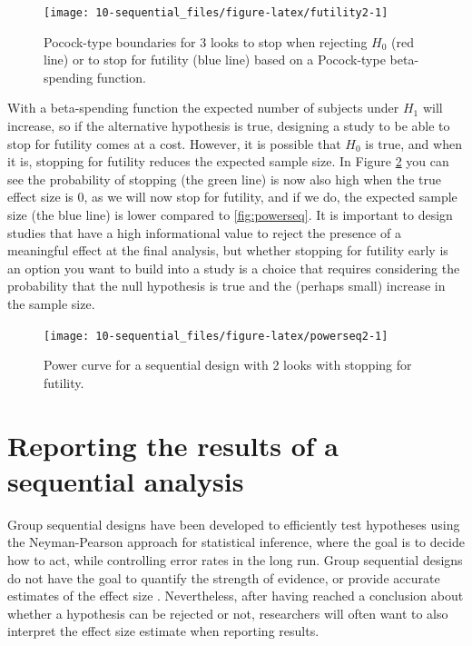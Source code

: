 \documentclass[
  oneside]{book}
\begin{document}
\begin{figure}

{\centering \texttt{[image: 10-sequential\_files/figure-latex/futility2-1]} 

}

\caption{Pocock-type boundaries for 3 looks to stop when rejecting $H_0$ (red line) or to stop for futility (blue line) based on a Pocock-type beta-spending function.}\label{fig:futility2}
\end{figure}

With a beta-spending function the expected number of subjects under \(H_1\) will increase, so if the alternative hypothesis is true, designing a study to be able to stop for futility comes at a cost. However, it is possible that \(H_0\) is true, and when it is, stopping for futility reduces the expected sample size. In Figure \ref{fig:powerseq2} you can see the probability of stopping (the green line) is now also high when the true effect size is 0, as we will now stop for futility, and if we do, the expected sample size (the blue line) is lower compared to \ref{fig:powerseq}. It is important to design studies that have a high informational value to reject the presence of a meaningful effect at the final analysis, but whether stopping for futility early is an option you want to build into a study is a choice that requires considering the probability that the null hypothesis is true and the (perhaps small) increase in the sample size.

\begin{figure}

{\centering \texttt{[image: 10-sequential\_files/figure-latex/powerseq2-1]} 

}

\caption{Power curve for a sequential design with 2 looks with stopping for futility.}\label{fig:powerseq2}
\end{figure}

\hypertarget{reporting-the-results-of-a-sequential-analysis}{%
\section{Reporting the results of a sequential analysis}\label{reporting-the-results-of-a-sequential-analysis}}

Group sequential designs have been developed to efficiently test hypotheses using the Neyman-Pearson approach for statistical inference, where the goal is to decide how to act, while controlling error rates in the long run. Group sequential designs do not have the goal to quantify the strength of evidence, or provide accurate estimates of the effect size \citep{proschan_statistical_2006}. Nevertheless, after having reached a conclusion about whether a hypothesis can be rejected or not, researchers will often want to also interpret the effect size estimate when reporting results.
\end{document}
